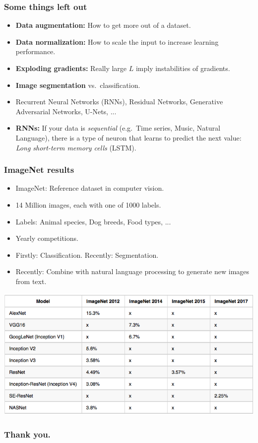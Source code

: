 \documentclass[10pt,hyperref={pdfpagelabels=false}]{beamer}
\begin{document}
\begin{frame}
    \frametitle{Some things left out}
    \begin{itemize}
        \item {\bf Data augmentation:} How to get more out of a dataset.
        \item {\bf Data normalization:} How to scale the input to increase learning performance.
        \item {\bf Exploding gradients:} Really large $L$ imply instabilities of gradients.
        \item {\bf Image segmentation} vs.~classification.
        \item Recurrent Neural Networks (RNNs), Residual Networks, Generative Adversarial Networks, U-Nets, ...
        \item {\bf RNNs:} If your data is \emph{sequential} (e.g.~Time series, Music, Natural Language), there is a type of neuron that learns to predict the next value: \emph{Long short-term memory cells} (LSTM).
    \end{itemize}
\end{frame}
\begin{frame}[allowframebreaks]
    \frametitle{ImageNet results}
    \begin{itemize}
        \item ImageNet: Reference dataset in computer vision.
        \item 14 Million images, each with one of 1000 labels.
        \item Labels: Animal species, Dog breeds, Food types, ...
        \item Yearly competitions.
        \item Firstly: Classification. Recently: Segmentation.
        \item Recently: Combine with natural language processing to generate new images from text.
    \end{itemize}
    \framebreak
    \centering\includegraphics[width=.9\textwidth]{figures/imagenet_results.png}
\end{frame}
\begin{frame}
    \frametitle{Thank you.}
\end{frame}
\end{document}
